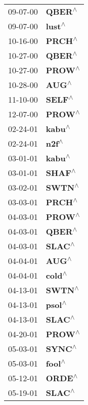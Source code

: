 \begin{supertabular}{p{0.08\textwidth}p{0.2\textwidth}}
 09-07-00 &    \textbf{QBER\textsuperscript{$\wedge$}} \\
 09-07-00 &    \textbf{lust\textsuperscript{$\wedge$}} \\
 10-16-00 &    \textbf{PRCH\textsuperscript{$\wedge$}} \\
 10-27-00 &    \textbf{QBER\textsuperscript{$\wedge$}} \\
 10-27-00 &    \textbf{PROW\textsuperscript{$\wedge$}} \\
 10-28-00 &     \textbf{AUG\textsuperscript{$\wedge$}} \\
 11-10-00 &    \textbf{SELF\textsuperscript{$\wedge$}} \\
 12-07-00 &    \textbf{PROW\textsuperscript{$\wedge$}} \\
 02-24-01 &    \textbf{kabu\textsuperscript{$\wedge$}} \\
 02-24-01 &     \textbf{n2f\textsuperscript{$\wedge$}} \\
 03-01-01 &    \textbf{kabu\textsuperscript{$\wedge$}} \\
 03-01-01 &    \textbf{SHAF\textsuperscript{$\wedge$}} \\
 03-02-01 &    \textbf{SWTN\textsuperscript{$\wedge$}} \\
 03-03-01 &    \textbf{PRCH\textsuperscript{$\wedge$}} \\
 04-03-01 &    \textbf{PROW\textsuperscript{$\wedge$}} \\
 04-03-01 &    \textbf{QBER\textsuperscript{$\wedge$}} \\
 04-03-01 &    \textbf{SLAC\textsuperscript{$\wedge$}} \\
 04-04-01 &     \textbf{AUG\textsuperscript{$\wedge$}} \\
 04-04-01 &    \textbf{cold\textsuperscript{$\wedge$}} \\
 04-13-01 &    \textbf{SWTN\textsuperscript{$\wedge$}} \\
 04-13-01 &    \textbf{psol\textsuperscript{$\wedge$}} \\
 04-13-01 &    \textbf{SLAC\textsuperscript{$\wedge$}} \\
 04-20-01 &    \textbf{PROW\textsuperscript{$\wedge$}} \\
 05-03-01 &    \textbf{SYNC\textsuperscript{$\wedge$}} \\
 05-03-01 &    \textbf{fool\textsuperscript{$\wedge$}} \\
 05-12-01 &    \textbf{ORDE\textsuperscript{$\wedge$}} \\
 05-19-01 &    \textbf{SLAC\textsuperscript{$\wedge$}} \\

\end{supertabular}
